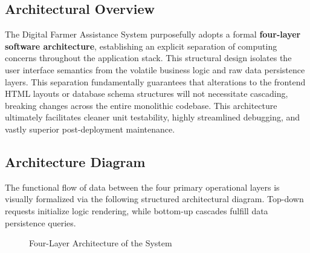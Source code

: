 \subsection{Architectural Overview}
The Digital Farmer Assistance System purposefully adopts a formal \textbf{four-layer software architecture}, establishing an explicit separation of computing concerns throughout the application stack. This structural design isolates the user interface semantics from the volatile business logic and raw data persistence layers. This separation fundamentally guarantees that alterations to the frontend HTML layouts or database schema structures will not necessitate cascading, breaking changes across the entire monolithic codebase. This architecture ultimately facilitates cleaner unit testability, highly streamlined debugging, and vastly superior post-deployment maintenance.

\subsection{Architecture Diagram}
The functional flow of data between the four primary operational layers is visually formalized via the following structured architectural diagram. Top-down requests initialize logic rendering, while bottom-up cascades fulfill data persistence queries.

\begin{figure}[!htbp]
\centering
{}
\caption{Four-Layer Architecture of the System}
\label{fig:architecture}
\end{figure}

